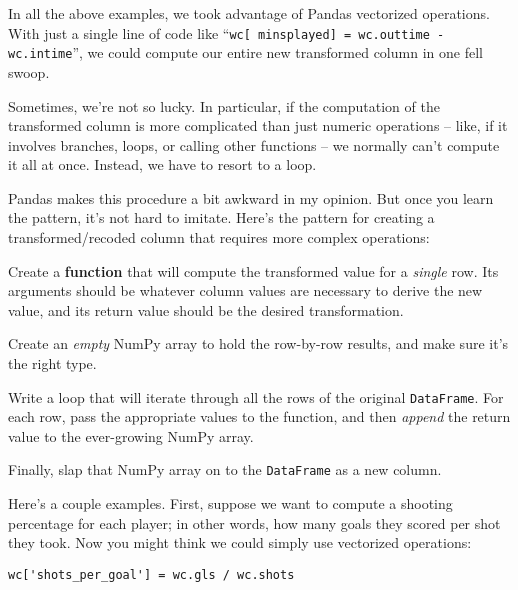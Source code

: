
In all the above examples, we took advantage of Pandas vectorized operations.
With just a single line of code like ``\texttt{wc[\textquotesingle
minsplayed\textquotesingle] = wc.outtime - wc.intime}'', we could compute
our entire new transformed column in one fell swoop.


Sometimes, we're not so lucky. In particular, if the computation of the
transformed column is more complicated than just numeric operations -- like, if
it involves branches, loops, or calling other functions -- we normally can't
compute it all at once. Instead, we have to resort to a loop.

Pandas makes this procedure a bit awkward in my opinion. But once you learn the
pattern, it's not hard to imitate. Here's the pattern for creating a
transformed/recoded column that requires more complex operations:

\begin{shaded}
\begin{compactenum}
\item Create a \textbf{function} that will compute the transformed value for a
\textit{single} row. Its arguments should be whatever column values are
necessary to derive the new value, and its return value should be the desired
transformation.
\item Create an \textit{empty} NumPy array to hold the row-by-row results, and
make sure it's the right type.
\item Write a loop that will iterate through all the rows of the original
\texttt{DataFrame}. For each row, pass the appropriate values to the function,
and then \textit{append} the return value to the ever-growing NumPy array.
\item Finally, slap that NumPy array on to the \texttt{DataFrame} as a new
column.
\end{compactenum}

\end{shaded}

Here's a couple examples. First, suppose we want to compute a shooting
percentage for each player; in other words, how many goals they scored per shot
they took. Now you might think we could simply use vectorized operations:

\begin{Verbatim}[fontsize=\small,samepage=true,frame=single,framesep=3mm]
wc['shots_per_goal'] = wc.gls / wc.shots
\end{Verbatim}

